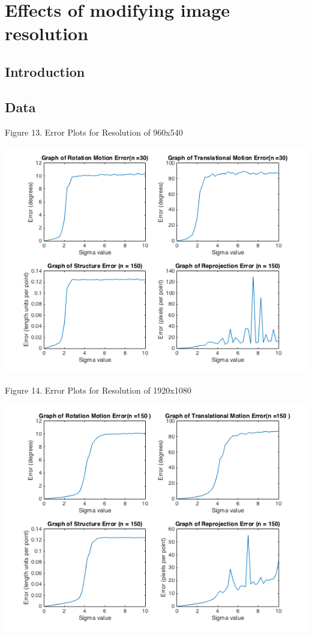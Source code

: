 \documentclass{article}
\begin{document}






\section{Effects of modifying image resolution}

\subsection{Introduction}

\subsection{Data}
\begin{center}
	\begin{center}Figure 13. Error Plots for Resolution of 960x540\end{center}
	\includegraphics[width=.7\textwidth,keepaspectratio]{960x540_error_plots.png}
	
	\begin{center}Figure 14. Error Plots for Resolution of 1920x1080\end{center}
	\includegraphics[width=.7\textwidth,keepaspectratio]{1920x1080_error_plots.png}
	

\end{center}
\end{document}
